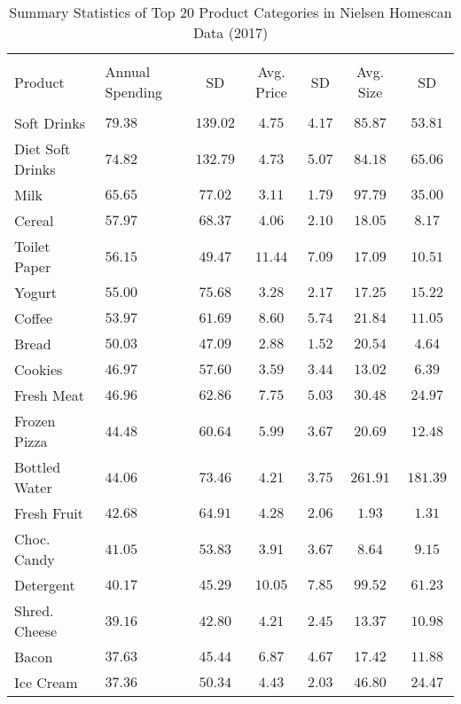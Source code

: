 \begin{table}[!htbp] \centering
  \caption{Summary Statistics of Top 20 Product Categories in Nielsen Homescan Data (2017)}
  \label{tab:homeScanProducts}
\begin{tabularx}{\linewidth}{lXccccc}
\\[-1.8ex]\hline
\hline \\[-1.8ex]
Product & Annual \newline Spending & SD & Avg. Price & SD  & Avg. Size & SD \\
\hline \\[-1.8ex]
Soft Drinks & $79.38$ & $139.02$ & $4.75$ & $4.17$ & $85.87$ & $53.81$ \\
Diet Soft Drinks & $74.82$ & $132.79$ & $4.73$ & $5.07$ & $84.18$ & $65.06$ \\
Milk & $65.65$ & $77.02$ & $3.11$ & $1.79$ & $97.79$ & $35.00$ \\
Cereal & $57.97$ & $68.37$ & $4.06$ & $2.10$ & $18.05$ & $8.17$ \\
Toilet Paper & $56.15$ & $49.47$ & $11.44$ & $7.09$ & $17.09$ & $10.51$ \\
Yogurt & $55.00$ & $75.68$ & $3.28$ & $2.17$ & $17.25$ & $15.22$ \\
Coffee & $53.97$ & $61.69$ & $8.60$ & $5.74$ & $21.84$ & $11.05$ \\
Bread & $50.03$ & $47.09$ & $2.88$ & $1.52$ & $20.54$ & $4.64$ \\
Cookies & $46.97$ & $57.60$ & $3.59$ & $3.44$ & $13.02$ & $6.39$ \\
Fresh Meat & $46.96$ & $62.86$ & $7.75$ & $5.03$ & $30.48$ & $24.97$ \\
Frozen Pizza & $44.48$ & $60.64$ & $5.99$ & $3.67$ & $20.69$ & $12.48$ \\
Bottled Water & $44.06$ & $73.46$ & $4.21$ & $3.75$ & $261.91$ & $181.39$ \\
Fresh Fruit & $42.68$ & $64.91$ & $4.28$ & $2.06$ & $1.93$ & $1.31$ \\
Choc. Candy & $41.05$ & $53.83$ & $3.91$ & $3.67$ & $8.64$ & $9.15$ \\
Detergent & $40.17$ & $45.29$ & $10.05$ & $7.85$ & $99.52$ & $61.23$ \\
Shred. Cheese & $39.16$ & $42.80$ & $4.21$ & $2.45$ & $13.37$ & $10.98$ \\
Bacon & $37.63$ & $45.44$ & $6.87$ & $4.67$ & $17.42$ & $11.88$ \\
Ice Cream & $37.36$ & $50.34$ & $4.43$ & $2.03$ & $46.80$ & $24.47$ \\

\end{tabularx}
\end{table}
